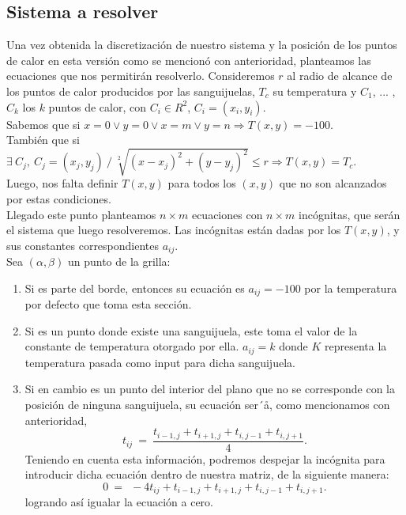 \subsection{Sistema a resolver}

Una vez obtenida la discretización de nuestro sistema y la posición de los puntos de calor en esta versión como se mencionó con anterioridad, planteamos las ecuaciones que nos permitirán resolverlo. Consideremos $r$ al radio de alcance de los puntos de calor producidos por las sanguijuelas, $T_c$ su temperatura y $C_1$, ... , $C_k$ los $k$ puntos de calor, con $C_i \in R^2$, $C_i = (x_i, y_i)$.\\

Sabemos que si $ x = 0 \vee y = 0 \vee x = m \vee y = n \Rightarrow T(x,y) = -100$. \\
También que si $\exists \: C_j, \: C_j = (x_j, y_j) \: / \: \sqrt[2]{(x-x_j)^2 + (y-y_j)^2} \le r \Rightarrow T(x,y) = T_c$. \\
Luego, nos falta definir $T(x,y)$ para todos los $(x,y)$ que no son alcanzados por estas condiciones.\\
Llegado este punto planteamos $n \times m$ ecuaciones con $n \times m$ incógnitas, que serán el sistema que luego resolveremos. Las incógnitas están dadas por los $T(x,y)$, y sus constantes correspondientes $a_{ij}$.\\

Sea $(\alpha,\beta)$ un punto de la grilla:
\begin{enumerate}
 \item Si es parte del borde, entonces su ecuación es $a_{ij} = -100$ por la temperatura por defecto que toma esta sección.
 \item Si es un punto donde existe una sanguijuela, este toma el valor de la constante de temperatura otorgado por ella. $a_{ij} = k$ donde $K$ representa la temperatura pasada como input para dicha sanguijuela.
 \item Si en cambio es un punto del interior del plano que no se corresponde con la posición de ninguna sanguijuela, su ecuación ser´å, como mencionamos con anterioridad, 
\begin{equation}
t_{ij} \ =\ \frac{ t_{i-1,j} + t_{i+1,j} + t_{i,j-1} + t_{i,j+1}}{4}.
\end{equation}
 Teniendo en cuenta esta información, podremos despejar la incógnita para introducir dicha ecuación dentro de nuestra matriz, de la siguiente manera:
\begin{equation}
0 \ =\ \ -4t_{ij} + t_{i-1,j} + t_{i+1,j} + t_{i,j-1} + t_{i,j+1}.
\end{equation}
logrando así igualar la ecuación a cero.
\end{enumerate}

